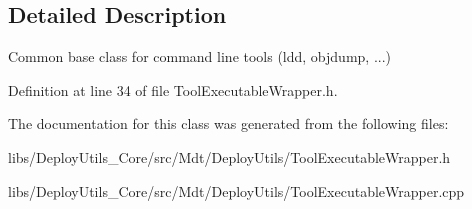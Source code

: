 \subsection{Detailed Description}
Common base class for command line tools (ldd, objdump, ...) 

Definition at line 34 of file Tool\+Executable\+Wrapper.\+h.



The documentation for this class was generated from the following files\+:\begin{DoxyCompactItemize}
\item 
libs/\+Deploy\+Utils\+\_\+\+Core/src/\+Mdt/\+Deploy\+Utils/Tool\+Executable\+Wrapper.\+h\item 
libs/\+Deploy\+Utils\+\_\+\+Core/src/\+Mdt/\+Deploy\+Utils/Tool\+Executable\+Wrapper.\+cpp\end{DoxyCompactItemize}
